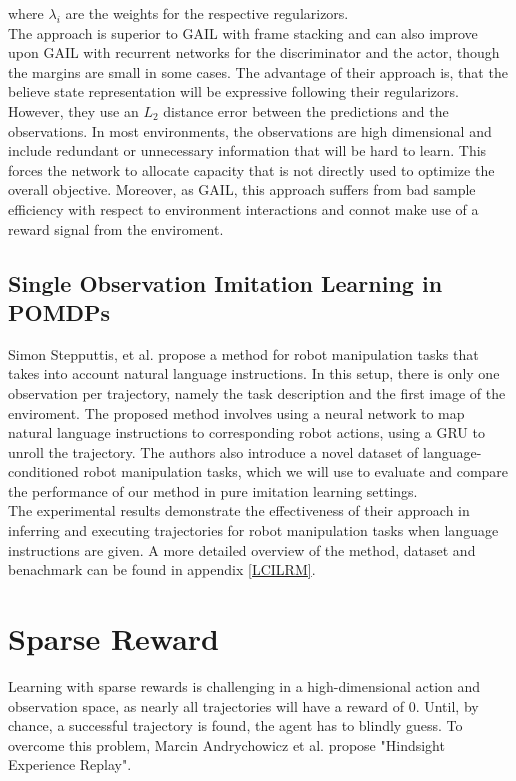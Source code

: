 where $\lambda_i$ are the weights for the respective regularizors. \\
The approach is superior to GAIL with frame stacking and can also improve upon GAIL with recurrent networks for the discriminator and the actor, though the margins are small in some cases. The advantage 
of their approach is, that the believe state representation will be expressive following their regularizors. However, they use an $L_2$ distance error between the predictions and the observations. In most environments, 
the observations are high dimensional and include redundant or unnecessary information that will be hard to learn. This forces the network to allocate capacity that is not directly used to 
optimize the overall objective. Moreover, as GAIL, this approach suffers from bad sample efficiency with respect to environment interactions and connot make use of a reward signal from the enviroment. 

\subsection{Single Observation Imitation Learning in POMDPs}
Simon Stepputtis, et al. \cite{stepputtis2020languageconditioned} propose a method for robot manipulation tasks that takes 
into account natural language instructions. 
In this setup, there is only one observation per trajectory, namely the task description and the first image of the enviroment.
The proposed method involves using a neural network to map natural language instructions to 
corresponding robot actions, using a GRU to unroll the trajectory. The authors also introduce a novel dataset of language-conditioned robot manipulation tasks, which we will use to evaluate 
and compare the performance of our method in pure imitation learning settings.\\ 
The experimental results demonstrate the effectiveness of their approach in inferring and executing trajectories for robot manipulation 
tasks when language instructions are given. A more detailed overview of the method, dataset and benachmark can be found in appendix \ref{LCILRM}.\\


\section{Sparse Reward}
\label{sec:HER}
Learning with sparse rewards is challenging in a high-dimensional action and observation space, as nearly all trajectories will have a reward of 0.
Until, by chance, a successful trajectory is found, the agent has to blindly guess. To overcome this problem, Marcin Andrychowicz et al. \cite{andrychowicz2018hindsight} 
propose "Hindsight Experience Replay".\\

